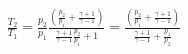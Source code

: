 \documentclass[10pt]{article}
\begin{document}
\begin{align*}\frac{T_{2}}{T_{1}}
=
\frac{p_2}{p_1} 
\frac{ 
\left( \frac{p_2}{p_1} + \frac{\gamma+1}{\gamma-1} \right) 
}
{ 
\frac{\gamma+1}{\gamma-1} \frac{p_2}{p_1} +1
}
=
\frac{ 
\left( \frac{p_2}{p_1} + \frac{\gamma+1}{\gamma-1} \right) 
}
{ 
\frac{\gamma+1}{\gamma-1} + \frac{p_1}{p_2} 
}\end{align*}
\end{document}
